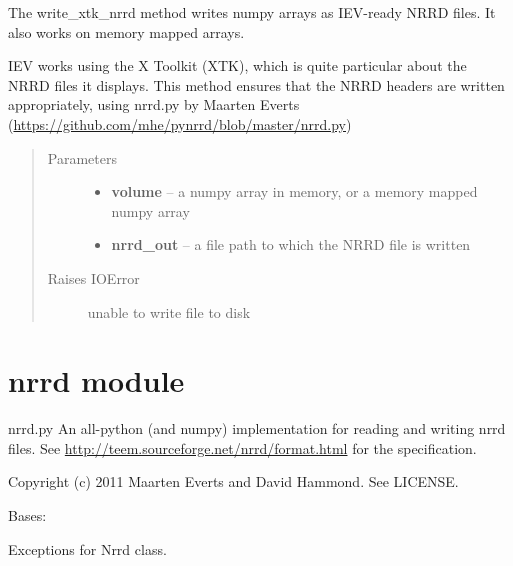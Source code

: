 \documentclass[letterpaper,10pt,english]{sphinxmanual}
\begin{document}
\begin{fulllineitems}
\label{conversion:conversion.write_xtk_nrrd}
The write\_xtk\_nrrd method writes numpy arrays as IEV-ready NRRD files. It also works on memory mapped arrays.

IEV works using the X Toolkit (XTK), which is quite particular about the NRRD files it displays. This method ensures
that the NRRD headers are written appropriately, using nrrd.py by Maarten Everts
(\href{https://github.com/mhe/pynrrd/blob/master/nrrd.py}{https://github.com/mhe/pynrrd/blob/master/nrrd.py})
\begin{quote}\begin{description}
\item[{Parameters}] \leavevmode\begin{itemize}
\item {} 
\textbf{volume} -- a numpy array in memory, or a memory mapped numpy array

\item {} 
\textbf{nrrd\_out} -- a file path to which the NRRD file is written

\end{itemize}

\item[{Raises IOError}] \leavevmode
unable to write file to disk

\end{description}\end{quote}

\end{fulllineitems}



\chapter{nrrd module}
\label{nrrd:nrrd-module}\label{nrrd:module-nrrd}\label{nrrd::doc}
nrrd.py
An all-python (and numpy) implementation for reading and writing nrrd files.
See \href{http://teem.sourceforge.net/nrrd/format.html}{http://teem.sourceforge.net/nrrd/format.html} for the specification.

Copyright (c) 2011 Maarten Everts and David Hammond. See LICENSE.

\begin{fulllineitems}
\label{nrrd:nrrd.NrrdError}
Bases: 

Exceptions for Nrrd class.

\end{fulllineitems}
\end{document}
